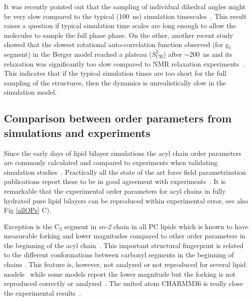 \documentclass[aps,prl,superscriptaddress,twocolumn]{revtex4}
\begin{document}
It was recently pointed out that the sampling of individual dihedral angles might be very
slow compared to the typical (100~ns) simulation timescales~\cite{vogel12}.
This result raises a question if typical simulation time scales are long enough to allow
the molecules to sample the full phase phase. On the other, another recent study showed
that the slowest rotational auto-correlation function observed (for g$_1$ segment) 
in the Berger model reached a plateau ($S_\mathrm{CH}^2$) after $\sim$200~ns
and its relaxation was significantly too slow compared to NMR relaxation experiments~\cite{ferreira15}. 
This indicates that if the typical simulation times are too short for the full sampling
of the structures, then the dynamics is unrealistically slow in the simulation model.


\subsection{Comparison between order parameters from simulations and experiments}

Since the early days of lipid bilayer simulations the acyl chain order parameters are commonly calculated and compared to experiments
when validating simulation studies~\cite{ploeg82,egberts88,stouch93,egberts94,essex94,robinson94,hyvonen95,kothekar96,tieleman96,shinoda97,berger97,tieleman97,klauda08}. 
Practically all the state of the art force field parametrization publications report these
to be in good agreement with experiments~\cite{berger97,hogberg08,poger10,ulmschneider09,kukol09,chiu09,klauda10,dickson12,jambeck12,chowdhary13,maciejewski14,tjornhammar14,dickson14,lee14}.
It is remarkable that the experimental order parameters for acyl chains in fully hydrated pure lipid bilayers
can be reproduced within experimental error, see also Fig \ref{allOPs} C). 

Exception is the C$_2$ segment in {\it sn-2} chain in all PC lipids which is known
to have measurable forking and lower magnitudes compared to other order parameters in 
the beginning of the acyl chain~\cite{??}. This important structural fingerprint is
related to the different conformations between carboxyl segments in the beginning of chains \cite{??}.
This feature is, however, not analyzed or not reproduced for several lipid models~\cite{hogberg08,chiu09,kukol09,ulmschneider09,jambeck12,dickson12,chowdhary13,tjornhammar14,maciejewski14}
while some models report the lower magnitude but the forking is not reproduced correctly or analyzed~\cite{klauda10,chowdhary13,dickson14}.
The united atom CHARMM36 is really close the experimental results~\cite{lee14}.
\end{document}
